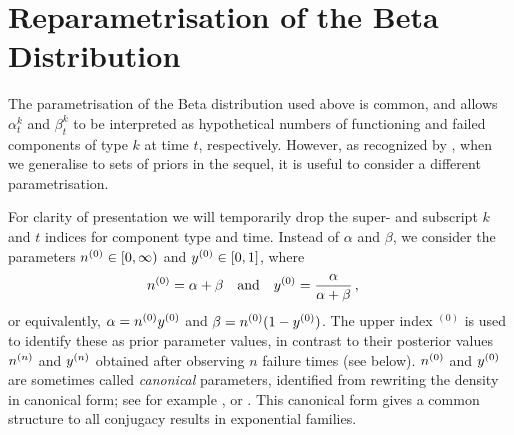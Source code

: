 \documentclass[12pt, a4paper]{elsarticle}
\newcommand{\uz}{^{(0)}} %
\begin{document}
\section{Reparametrisation of the Beta Distribution}
\label{sec:reparam}

The parametrisation of the Beta distribution used above is common,
and allows $\alpha^k_t$ and $\beta^k_t$ to be interpreted as
hypothetical numbers of functioning and failed components of type $k$ at time $t$, respectively.
However, as recognized by \citep[\S 5.3]{1991:walley}, when we generalise to sets of priors in the sequel,
it is useful to consider a different parametrisation.

For clarity of presentation we will temporarily drop the super- and subscript $k$ and $t$ indices for component type and time.
Instead of $\alpha$ and $\beta$, we consider the parameters $\nz \in [0, \infty)$ and $\yz \in [0,1]$, where
\begin{align}
\nz &= \alpha + \beta &
&\text{and} &
\yz &= \frac{\alpha}{\alpha + \beta} \,,
\label{eq:reparam}
\end{align}
or equivalently, $\alpha = \nz\yz$ and $\beta = \nz(1-\yz)$.
The upper index ${}\uz$ is used to identify these as prior parameter values,
in contrast to their posterior values $n^{(n)}$ and $y^{(n)}$
obtained after observing $n$ failure times (see below).
$\nz$ and $\yz$ are sometimes called \emph{canonical} parameters,
identified from rewriting the density in canonical form;
see for example \cite[pp.~202 and 272f]{2000:bernardosmith}, or \cite[\S 1.2.3.1]{2013:diss-gw}.
This canonical form gives a common structure to all conjugacy results in exponential families.
\end{document}
